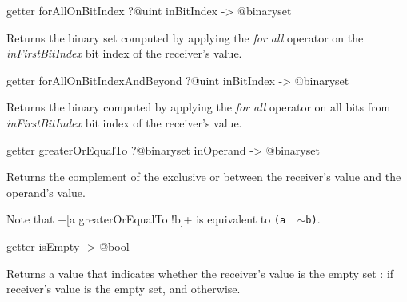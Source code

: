 
\begin{galgascode}
getter forAllOnBitIndex ?@uint inBitIndex -> @binaryset
\end{galgascode}

Returns the binary set computed by applying the \emph{for all} operator on the \emph{inFirstBitIndex} bit index of the receiver's value.








\begin{galgascode}
getter forAllOnBitIndexAndBeyond ?@uint inBitIndex -> @binaryset
\end{galgascode}


Returns the binary computed by applying the \emph{for all} operator on all bits from \emph{inFirstBitIndex} bit index of the receiver's value.









\begin{galgascode}
getter greaterOrEqualTo ?@binaryset inOperand -> @binaryset
\end{galgascode}


Returns the complement of the exclusive or between the receiver's value and the operand's value.

Note that \ggs+[a greaterOrEqualTo !b]+ is equivalent to \texttt{(a \textbar ~$\sim$b)}.









\begin{galgascode}
getter isEmpty -> @bool
\end{galgascode}

Returns a  value that indicates whether the receiver's value is the empty set :   if receiver's value is the empty set, and  otherwise.








